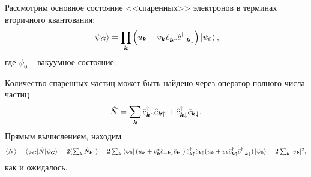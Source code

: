


Рассмотрим основное состояние <<спаренных>> электронов в терминах вторичного квантования:
\begin{equation*}
	\left| \psi_G \right\rangle = \prod_{{\boldsymbol{k}}} \left(
		u_{{\boldsymbol{k}}} + v_{{\boldsymbol{k}}} \hat{c}^{\dag}_{{\boldsymbol{k}} \uparrow} \hat{c}^{\dag}_{-{\boldsymbol{k}}\downarrow}
	\right) \left| \psi_0 \right\rangle,
\end{equation*}
где $\psi_0$ -- вакуумное состояние. 

Количество спаренных частиц может быть найдено через оператор полного числа частиц
\begin{equation*}
	\hat{N} = \sum_{{\boldsymbol{k}}}  \hat{c}^{\dag}_{{\boldsymbol{k}} \uparrow} \hat{c}_{{\boldsymbol{k}} \uparrow} + \hat{c}^{\dag}_{{\boldsymbol{k}} \downarrow} \hat{c}_{{\boldsymbol{k}} \downarrow}.
\end{equation*}
Прямым вычислением, находим
\begin{equation*}
	\langle N\rangle = \bk{\psi_G}[\hat{N}]{\psi_G} = 2 \langle \textstyle\sum_{\vc{k}} \hat{N}_{\vc{k} \up} \rangle 
	= 2 \sum_{\vc{k}} \bra{\psi_0}
	 \left(
		u_\vc{k} + v_{\vc{k}}^* \hat{c}_{-\vc{k}\down} \hat{c}_{\vc{k} \up}
	\right)
	\hat{c}_{\vc{k} \up}\D \hat{c}_{\vc{k} \up} 
	(
		u_k + v_k \hat{c}\D_{\vc{k} \up} \hat{c}_{-\vc{k}\down}\D
	) \ket{\psi_0} = 2 \sum_{\vc{k}} |v_{\vc{k}}|^2,
\end{equation*}
как и ожидалось. 


